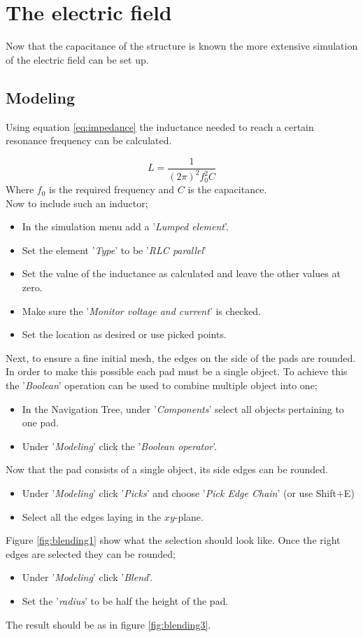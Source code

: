 \section{The electric field}
Now that the capacitance of the structure is known the more extensive simulation of the electric field can be set up.
\subsection{Modeling}
Using equation \eqref{eq:impedance} the inductance needed to reach a certain resonance frequency can be calculated. 

\begin{equation}\label{eq:impedance}
L = \frac{1}{(2\pi)^{2}f_{0}^{2}C}
\end{equation}
Where \(f_{0}\) is the required frequency and \(C\) is the capacitance.\\
Now to include such an inductor;
\begin{itemize}
	\item In the simulation menu add a '\textit{Lumped element}'.
	\item Set the element '\textit{Type}' to be '\textit{RLC parallel}'
	\item Set the value of the inductance as calculated and leave the other values at zero.
	\item Make sure the '\textit{Monitor voltage and current}' is checked.
	\item Set the location as desired or use picked points.
\end{itemize}

Next, to ensure a fine initial mesh, the edges on the side of the pads are rounded. In order to make this possible each pad must be a single object. To achieve this the '\textit{Boolean}' operation can be used to combine multiple object into one;

\begin{itemize}
	\item In the Navigation Tree, under '\textit{Components}' select all objects pertaining to one pad.
	\item Under '\textit{Modeling}' click the '\textit{Boolean operator}'.
\end{itemize}
Now that the pad consists of a single object, its side edges can be rounded.
\begin{itemize}
	\item Under '\textit{Modeling}' click '\textit{Picks}' and choose '\textit{Pick Edge Chain}' (or use Shift+E)
	\item Select all the edges laying in the \(xy\)-plane.
\end{itemize}
Figure \ref{fig:blending1} show what the selection should look like. Once the right edges are selected they can be rounded;
\begin{itemize}
	\item Under '\textit{Modeling}' click '\textit{Blend}'.
	\item Set the '\textit{radius}' to be half the height of the pad. 
\end{itemize}
The result should be as in figure \ref{fig:blending3}.


